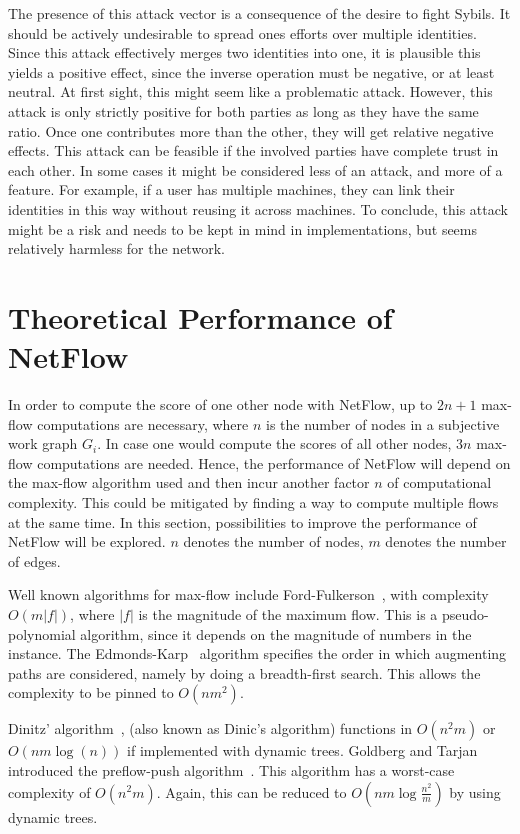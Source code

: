 \documentclass[a4paper,11pt]{book}
\theoremstyle{definition}
\begin{document}
The presence of this attack vector is a consequence of the desire to fight Sybils. It should be
actively undesirable to spread ones efforts over multiple identities. Since this attack 
effectively merges two identities into one, it is plausible this yields a positive effect,
since the inverse operation must be negative, or at least neutral. At first sight, this
might seem like a problematic attack. However, this attack is only strictly positive for both parties as long
as they have the same ratio. Once one contributes more than the other, they will get relative negative
effects. This attack can be feasible if the involved parties have complete trust in each other. In some
cases it might be considered less of an attack, and more of a feature. For example, if a user
has multiple machines, they can link their identities in this way without reusing it across machines.
To conclude, this attack might be a risk and needs to be kept in mind in implementations, but seems relatively
harmless for the network.


\section{Theoretical Performance of NetFlow}

In order to compute the score of one other node with NetFlow, up to $2n+1$ max-flow
computations are necessary, where $n$ is the number of nodes in a subjective work graph $G_i$. 
In case one would compute
the scores of all other nodes, $3n$ max-flow computations are needed. Hence, the
performance of NetFlow will depend on the max-flow algorithm used and then incur
another factor $n$ of computational complexity. This could be mitigated by finding
a way to compute multiple flows at the same time. In this section, possibilities
to improve the performance of NetFlow will be explored. $n$ denotes
the number of nodes, $m$ denotes the number of edges.

Well known algorithms for max-flow include Ford-Fulkerson~\cite{ford1956maximal},
with complexity $O(m|f|)$, where $|f|$ is the magnitude of the maximum flow. This
is a pseudo-polynomial algorithm, since it depends on the magnitude of numbers
in the instance.
The Edmonds-Karp~\cite{edmonds1972theoretical} algorithm specifies the order in which 
augmenting paths are considered, namely by doing a breadth-first search. This allows
the complexity to be pinned to $O(nm^2)$.

Dinitz' algorithm~\cite{dinitz2006dinitz}, (also known as Dinic's algorithm) functions
in $O(n^2m)$ or $O(nm\log(n))$ if implemented with dynamic trees. Goldberg and Tarjan
introduced the preflow-push algorithm~\cite{goldberg1988new}. This algorithm
has a worst-case complexity of $O(n^2m)$. Again, this can be reduced to
$O(nm\log\frac{n^2}{m})$ by using dynamic trees.
\end{document}
